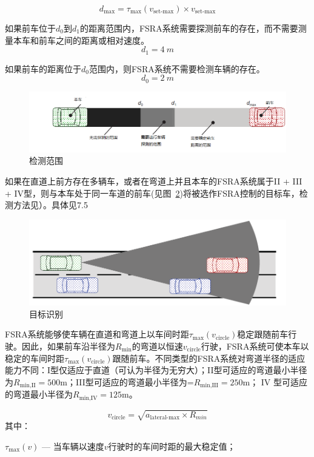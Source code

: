 \documentclass[is,copyright,is]{isov2}
\begin{document}
\[d_\text{max} = \tau_\text{max}(v_\text{set-max})\times v_\text{set-max}\]

如果前车位于$d_0$到$d_1$的距离范围内，FSRA系统需要探测前车的存在，而不需要测量本车和前车之间的距离或相对速度。
\[d_1 = \SI{4}{m}\]

如果前车的距离位于$d_0$范围内，则FSRA系统不需要检测车辆的存在。
\[d_0 =\SI{2}{m} \]
\begin{figure}[htbp]
	\centering
	\includegraphics[width=0.7\linewidth]{figures/zonesofdetection}
	\caption{检测范围}
	\label{fig:zonesofdetection}
\end{figure}
\label{sec:disc}

如果在直道上前方存在多辆车，或者在弯道上并且本车的FSRA系统属于II + III + IV型，则与本车处于同一车道的前车(见图~\ref{fig:targetdisciminnation})将被选作FSRA控制的目标车，检测方法见）。具体见7.5
\begin{figure}[htbp]
	\centering
	\includegraphics[width=0.7\linewidth]{figures/targetdisciminnation}
	\caption{目标识别}
	\label{fig:targetdisciminnation}
\end{figure}


FSRA系统能够使车辆在直道和弯道上以车间时距$\tau_\text{max}(v_\text{circle})$稳定跟随前车行驶。因此，如果前车沿半径为$R_\text{min}$的弯道以恒速$v_\text{circle}$行驶，FSRA系统可使本车以稳定的车间时距$\tau_\text{max}(v_\text{circle})$跟随前车。不同类型的FSRA系统对弯道半径的适应能力不同：I型仅适应于直道（可认为半径为无穷大）；II型可适应的弯道最小半径为$R_\text{min,II} = 500$m；III型可适应的弯道最小半径为=$R_\text{min,III} = 250$m； IV 型可适应的弯道最小半径为$R_\text{min,IV} = 125$m。

\[v_\text{circle} = \sqrt{a_\text{lateral-max}\times R_{min}}\]
其中：

$\tau_\text{max}(v)$ --- 当车辆以速度$v$行驶时的车间时距的最大稳定值；
\end{document}
